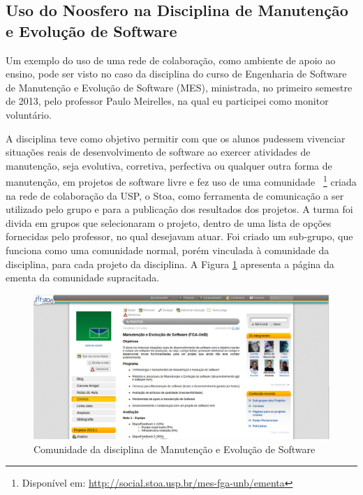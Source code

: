 
\subsection{Uso do Noosfero na Disciplina de Manutenção e Evolução de Software}
\label{mes-unb}

Um exemplo do uso de uma rede de colaboração, como ambiente de apoio ao ensino,
pode ser visto no caso da disciplina do curso de Engenharia de Software de
Manutenção e Evolução de Software (MES), ministrada, no primeiro semestre de
2013, pelo professor Paulo Meirelles, na qual eu participei como monitor
voluntário.

A disciplina teve como objetivo permitir com que os
alunos pudessem vivenciar situações reais de desenvolvimento de software ao
exercer atividades de manutenção, seja evolutiva, corretiva, perfectiva ou
qualquer outra forma de manutenção, em projetos de software livre e fez uso de
uma comunidade
~\footnote{Disponível em: \url{http://social.stoa.usp.br/mes-fga-unb/ementa}}
criada na rede de colaboração da USP, o Stoa, como ferramenta de comunicação a ser
utilizado pelo grupo e para a publicação dos resultados dos projetos.
%
A turma foi divida em grupos que selecionaram o projeto, dentro de uma lista
de opções fornecidas pelo professor, no qual desejavam atuar. Foi criado um 
sub-grupo, que funciona como uma comunidade normal, porém vinculada à comunidade
da disciplina, para cada projeto da disciplina. A Figura \ref{mes-unb}
apresenta a página da ementa da comunidade supracitada. 

\begin{figure}[h]
	\centering
	\includegraphics[keepaspectratio=true,scale=0.3]
	  {figuras/mes-unb.eps}
	\caption{Comunidade da disciplina de Manutenção e Evolução de Software}
	\label{mes-unb}
\end{figure}

